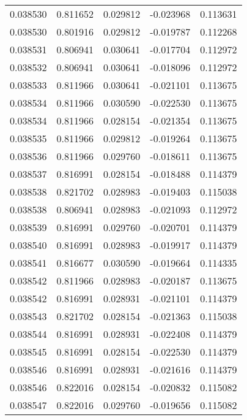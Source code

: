\begin{tabular}{lrrrr}
0.038530    &  0.811652 &  0.029812 & -0.023968 &             0.113631 \\
0.038530    &  0.801916 &  0.029812 & -0.019787 &             0.112268 \\
0.038531    &  0.806941 &  0.030641 & -0.017704 &             0.112972 \\
0.038532    &  0.806941 &  0.030641 & -0.018096 &             0.112972 \\
0.038533    &  0.811966 &  0.030641 & -0.021101 &             0.113675 \\
0.038534    &  0.811966 &  0.030590 & -0.022530 &             0.113675 \\
0.038534    &  0.811966 &  0.028154 & -0.021354 &             0.113675 \\
0.038535    &  0.811966 &  0.029812 & -0.019264 &             0.113675 \\
0.038536    &  0.811966 &  0.029760 & -0.018611 &             0.113675 \\
0.038537    &  0.816991 &  0.028154 & -0.018488 &             0.114379 \\
0.038538    &  0.821702 &  0.028983 & -0.019403 &             0.115038 \\
0.038538    &  0.806941 &  0.028983 & -0.021093 &             0.112972 \\
0.038539    &  0.816991 &  0.029760 & -0.020701 &             0.114379 \\
0.038540    &  0.816991 &  0.028983 & -0.019917 &             0.114379 \\
0.038541    &  0.816677 &  0.030590 & -0.019664 &             0.114335 \\
0.038542    &  0.811966 &  0.028983 & -0.020187 &             0.113675 \\
0.038542    &  0.816991 &  0.028931 & -0.021101 &             0.114379 \\
0.038543    &  0.821702 &  0.028154 & -0.021363 &             0.115038 \\
0.038544    &  0.816991 &  0.028931 & -0.022408 &             0.114379 \\
0.038545    &  0.816991 &  0.028154 & -0.022530 &             0.114379 \\
0.038546    &  0.816991 &  0.028931 & -0.021616 &             0.114379 \\
0.038546    &  0.822016 &  0.028154 & -0.020832 &             0.115082 \\
0.038547    &  0.822016 &  0.029760 & -0.019656 &             0.115082 \\

\end{tabular}
